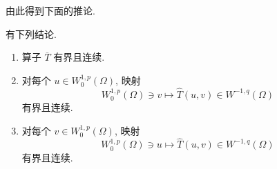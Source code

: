 由此得到下面的推论.

\begin{Corollary}
\label{cor:cv-pde-partial-argument-continuity}
有下列结论.\begin{enumerate}\item 算子 $\overline T$ 有界且连续.\item 对每个 $u\in W_0^{1,p}(\Omega)$, 映射
\begin{equation}\label{eq:cv-pde-two-argument-second-variable-continuity}
W_0^{1,p}(\Omega)\ni v\mapsto\widehat T(u,v)\in W^{-1,q}(\Omega)
\end{equation}
有界且连续.\item 对每个 $v\in W_0^{1,p}(\Omega)$, 映射
\begin{equation}\label{eq:cv-pde-two-argument-first-variable-continuity}
W_0^{1,p}(\Omega)\ni u\mapsto\widehat T(u,v)\in W^{-1,q}(\Omega)
\end{equation}
有界且连续.\end{enumerate}
\end{Corollary}

